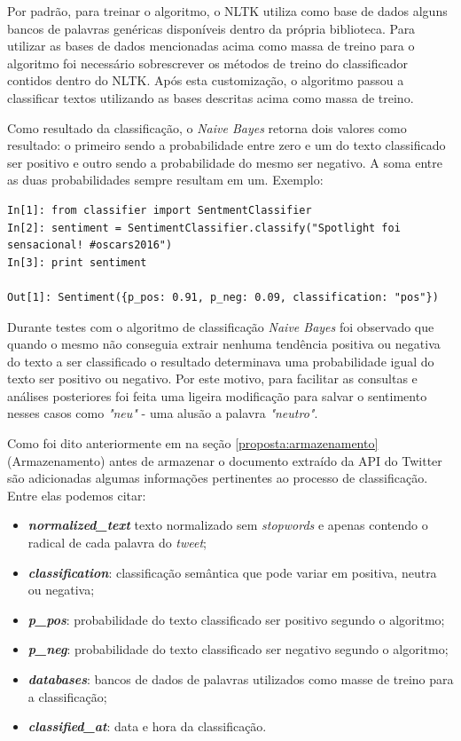 Por padrão, para treinar o algoritmo, o NLTK utiliza como base de dados alguns bancos de palavras genéricas disponíveis dentro da própria biblioteca. Para utilizar as bases de dados mencionadas acima como massa de treino para o algoritmo foi necessário sobrescrever os métodos de treino do classificador contidos dentro do NLTK. Após esta customização, o algoritmo passou a classificar textos utilizando as bases descritas acima como massa de treino.

Como resultado da classificação, o \textit{Naive Bayes} retorna dois valores como resultado: o primeiro sendo a probabilidade entre zero e um do texto classificado ser positivo e outro sendo a probabilidade do mesmo ser negativo. A soma entre as duas probabilidades sempre resultam em um. Exemplo:

\begin{lstlisting}[style=python, frame=single]
In[1]: from classifier import SentmentClassifier
In[2]: sentiment = SentimentClassifier.classify("Spotlight foi sensacional! #oscars2016")
In[3]: print sentiment

Out[1]: Sentiment({p_pos: 0.91, p_neg: 0.09, classification: "pos"})

\end{lstlisting}

Durante testes com o algoritmo de classificação \textit{Naive Bayes} foi observado que quando o mesmo não conseguia extrair nenhuma tendência positiva ou negativa do texto a ser classificado o resultado determinava uma probabilidade igual do texto ser positivo ou negativo. Por este motivo, para facilitar as consultas e análises posteriores foi feita uma ligeira modificação para salvar o sentimento nesses casos como \textit{"neu"} - uma alusão a palavra \textit{"neutro"}.

Como foi dito anteriormente em na seção \ref{proposta:armazenamento} (Armazenamento) antes de armazenar o documento extraído da API do Twitter são adicionadas algumas informações pertinentes ao processo de classificação. Entre elas podemos citar:

\begin{itemize}
	\item \textit{\textbf{normalized\_text}} texto normalizado sem \textit{stopwords} e apenas contendo o radical de cada palavra do \textit{tweet};
	\item \textit{\textbf{classification}}: classificação semântica que pode variar em positiva, neutra ou negativa;
	\item \textit{\textbf{p\_pos}}: probabilidade do texto classificado ser positivo segundo o algoritmo;
	\item \textit{\textbf{p\_neg}}: probabilidade do texto classificado ser negativo segundo o algoritmo;
	\item \textit{\textbf{databases}}: bancos de dados de palavras utilizados como masse de treino para a classificação;
	\item \textit{\textbf{classified\_at}}: data e hora da classificação.
\end{itemize}

